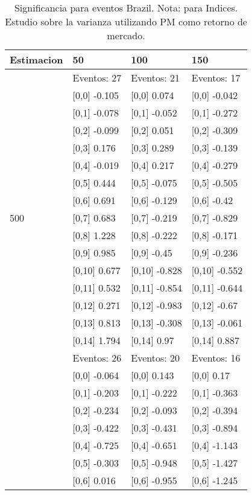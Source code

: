 \begin{table}

\caption{Significancia para eventos Brazil. Nota: para Indices. Estudio sobre la varianza utilizando PM como retorno de mercado.}
\centering
\begin{tabular}[t]{llll}
\toprule
Estimacion & 50 & 100 & 150\\
\midrule
 & Eventos:  27 & Eventos:  21 & Eventos:  17\\
 & {}[0,0] -0.105 & {}[0,0] 0.074 & {}[0,0] -0.042\\
 & {}[0,1] -0.078 & {}[0,1] -0.052 & {}[0,1] -0.272\\
 & {}[0,2] -0.099 & {}[0,2] 0.051 & {}[0,2] -0.309\\
 & {}[0,3] 0.176 & {}[0,3] 0.289 & {}[0,3] -0.139\\
\addlinespace
 & {}[0,4] -0.019 & {}[0,4] 0.217 & {}[0,4] -0.279\\
 & {}[0,5] 0.444 & {}[0,5] -0.075 & {}[0,5] -0.505\\
 & {}[0,6] 0.691 & {}[0,6] -0.129 & {}[0,6] -0.42\\
500 & {}[0,7] 0.683 & {}[0,7] -0.219 & {}[0,7] -0.829\\
 & {}[0,8] 1.228 & {}[0,8] -0.222 & {}[0,8] -0.171\\
\addlinespace
 & {}[0,9] 0.985 & {}[0,9] -0.45 & {}[0,9] -0.236\\
 & {}[0,10] 0.677 & {}[0,10] -0.828 & {}[0,10] -0.552\\
 & {}[0,11] 0.532 & {}[0,11] -0.854 & {}[0,11] -0.644\\
 & {}[0,12] 0.271 & {}[0,12] -0.983 & {}[0,12] -0.67\\
 & {}[0,13] 0.813 & {}[0,13] -0.308 & {}[0,13] -0.061\\
\addlinespace
 & {}[0,14] 1.794 & {}[0,14] 0.97 & {}[0,14] 0.887\\
 & Eventos:  26 & Eventos:  20 & Eventos:  16\\
 & {}[0,0] -0.064 & {}[0,0] 0.143 & {}[0,0] 0.17\\
 & {}[0,1] -0.203 & {}[0,1] -0.222 & {}[0,1] -0.363\\
 & {}[0,2] -0.234 & {}[0,2] -0.093 & {}[0,2] -0.394\\
\addlinespace
 & {}[0,3] -0.422 & {}[0,3] -0.431 & {}[0,3] -0.894\\
 & {}[0,4] -0.725 & {}[0,4] -0.651 & {}[0,4] -1.143\\
 & {}[0,5] -0.303 & {}[0,5] -0.948 & {}[0,5] -1.427\\
 & {}[0,6] 0.016 & {}[0,6] -0.955 & {}[0,6] -1.245\\

\end{tabular}
\end{table}
